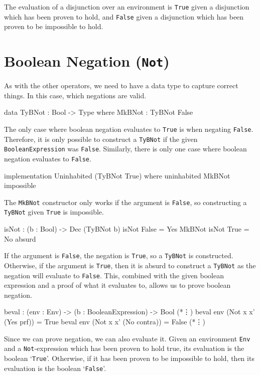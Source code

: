     The evaluation of a disjunction over an environment is \texttt{True} given a disjunction which has been proven to hold, and \texttt{False} given a disjunction which has been proven to be impossible to hold.


\section{Boolean Negation (\texttt{Not})}\label{des:not}
    As with the other operators, we need to have a data type to capture correct things. In this case, which negations are valid.
    
    \begin{code}[caption={The case where \texttt{Not} would evaluate to \texttt{True}}]
            data TyBNot : Bool -> Type where
                MkBNot  : TyBNot False
    \end{code}
    
    The only case where boolean negation evaluates to \texttt{True} is when negating \texttt{False}. Therefore, it is only possible to construct a \texttt{TyBNot} if the given \texttt{BooleanExpression} was \texttt{False}.
    Similarly, there is only one case where boolean negation evaluates to \texttt{False}.
    
    \begin{code}[label={des:not-uninh}, caption={The \texttt{uninhabited} case for constructing a \texttt{TyBNot}}]
        implementation Uninhabited (TyBNot True) where
            uninhabited MkBNot impossible
    \end{code}
    
    The \texttt{MkBNot} constructor only works if the argument is \texttt{False}, so constructing a \texttt{TyBNot} given \texttt{True} is impossible.
    
    \begin{code}[caption={Decidability rules for \texttt{Not}}]
        isNot : (b : Bool) -> Dec (TyBNot b)
        isNot False = Yes MkBNot
        isNot True  = No absurd
    \end{code}
    
    If the argument is \texttt{False}, the negation is \texttt{True}, so a \texttt{TyBNot} is constructed. Otherwise, if the argument is \texttt{True}, then it is absurd to construct a \texttt{TyBNot} as the negation will evaluate to \texttt{False}. This, combined with the given boolean expression and a proof of what it evaluates to, allows us to prove boolean negation.

    \begin{code}[caption={\texttt{beval} for \texttt{Not}}, escapeinside={(*}{*)}]
        beval : (env : Env) -> (b : BooleanExpression) -> Bool
            (*\vdots*)
        beval env (Not x x' (Yes prf))   = True
        beval env (Not x x' (No contra)) = False
            (*\vdots*)
    \end{code}
    
    Since we can prove negation, we can also evaluate it. Given an environment \texttt{Env} and a \texttt{Not}-expression which has been proven to hold true, its evaluation is the boolean `\texttt{True}'. Otherwise, if it has been proven to be impossible to hold, then its evaluation is the boolean `\texttt{False}'.

